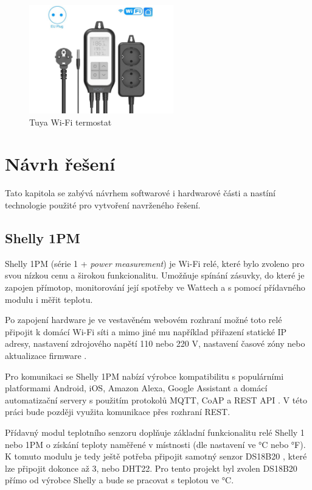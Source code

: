 \begin{figure}[hbt]
\centering
\includegraphics[width=0.56\textwidth]{obrazky-figures/tuyaterm.png}
\caption{Tuya Wi-Fi termostat}
\end{figure}


\chapter{Návrh řešení}
\label{navrh}
Tato kapitola se zabývá návrhem softwarové i hardwarové části a nastíní technologie použité pro vytvoření navrženého řešení.

\section{Shelly 1PM}
\label{navrh-shelly}
Shelly 1PM (série 1 + {\it power measurement}) je Wi-Fi relé, které bylo zvoleno pro svou nízkou cenu a širokou funkcionalitu. Umožňuje spínání zásuvky, do které je zapojen přímotop, monitorování její spotřeby ve Wattech a s pomocí přídavného modulu i měřit teplotu.

Po zapojení hardware je ve vestavěném webovém rozhraní možné toto relé připojit k domácí Wi-Fi síti a mimo jiné mu například přiřazení statické IP adresy, nastavení zdrojového napětí 110 nebo 220 V, nastavení časové zóny nebo aktualizace firmware \cite{shelly_1pm}.

Pro komunikaci se Shelly 1PM nabízí výrobce kompatibilitu s populárními platformami Android, iOS, Amazon Alexa, Google Assistant a domácí automatizační servery s použitím protokolů MQTT, CoAP a REST API \cite{shelly_1pm}. V této práci bude později využita komunikace přes rozhraní REST.

Přídavný modul teplotního senzoru \cite{shelly_tempaddon} doplňuje základní funkcionalitu relé Shelly 1 nebo 1PM o získání teploty naměřené v místnosti (dle nastavení ve °C nebo °F). K tomuto modulu je tedy ještě potřeba připojit samotný senzor DS18B20 \cite{shelly_tempsensor}, které lze připojit dokonce až 3, nebo DHT22. Pro tento projekt byl zvolen DS18B20 přímo od výrobce Shelly  a bude se pracovat s teplotou ve °C.

